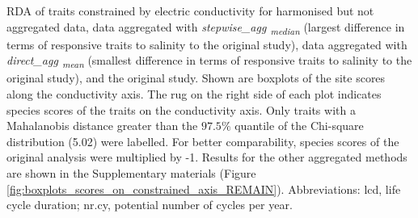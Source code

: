 \documentclass[12pt]{article}
\begin{document}

RDA of traits constrained by electric conductivity for harmonised but not aggregated data, data aggregated with \textit{stepwise\_agg \textsubscript{median}} (largest difference in terms of responsive traits to salinity to the original study), data aggregated with \textit{direct\_agg \textsubscript{mean}} (smallest difference in terms of responsive traits to salinity to the original study), and the original study. Shown are boxplots of the site scores along the conductivity axis. The rug on the right side of each plot indicates species scores of the traits on the conductivity axis. Only traits with a Mahalanobis distance greater than the $97.5 \%$ quantile of the Chi-square distribution (5.02) were labelled. For better comparability, species scores of the original analysis were multiplied by -1. Results for the other aggregated methods are shown in the Supplementary materials (Figure \ref{fig:boxplots_scores_on_constrained_axis_REMAIN}). Abbreviations: lcd, life cycle duration; nr.cy, potential number of cycles per year.
\end{document}

